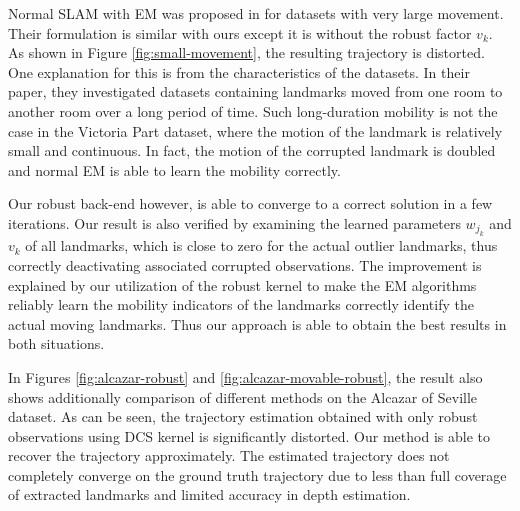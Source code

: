 Normal SLAM with EM was proposed in \cite{rogers2010slam} for datasets with
very large movement. Their formulation is similar with ours except it is
without the robust factor $v_k$.  As shown in Figure \ref{fig:small-movement},
the resulting trajectory is distorted. One explanation for this is from the
characteristics of the datasets.  In their paper, they investigated datasets
containing landmarks moved from one room to another room over a long period of
time.%
Such long-duration mobility is not the case in the Victoria Part dataset, where the motion of the landmark is relatively small and continuous. In fact, %
the motion of the
corrupted landmark is doubled and normal EM is able to learn the mobility
correctly.

Our robust back-end however, is able to converge to a correct solution in a few
iterations. Our result is also verified by examining the learned parameters
$w_{j_k}$ and $v_k$ of all landmarks, which is close to zero for the actual
outlier landmarks, thus correctly deactivating associated corrupted
observations.  The improvement is explained by our utilization of the robust
kernel to make the EM algorithms reliably learn the mobility indicators of the
landmarks correctly identify the actual moving landmarks. Thus our approach is
able to obtain the best results in both situations.

In Figures \ref{fig:alcazar-robust} and \ref{fig:alcazar-movable-robust}, the
result also shows additionally comparison of different methods on the Alcazar of
Seville dataset. As can be seen, the trajectory estimation obtained with only
robust observations using DCS kernel is significantly distorted. Our method is
able to recover the trajectory approximately. The estimated trajectory does not
completely converge on the ground truth trajectory due to less than full
coverage of extracted landmarks and limited accuracy in depth estimation.

